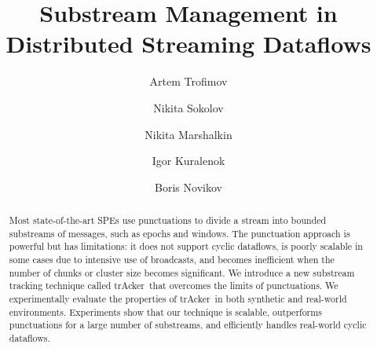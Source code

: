 \documentclass[sigconf]{acmart}
\newcommand {\tracker} {trAcker}
\begin{document}
\title {Substream Management in Distributed Streaming Dataflows}

\author{Artem Trofimov}

\author{Nikita Sokolov}

\author{Nikita Marshalkin}

\author{Igor Kuralenok}

\author{Boris Novikov}


\begin{abstract}
Most state-of-the-art SPEs use punctuations to divide a stream into bounded substreams of messages, such as epochs and windows. The punctuation approach is powerful but has limitations: it does not support cyclic dataflows, is poorly scalable in some cases due to intensive use of broadcasts, and becomes inefficient when the number of chunks or cluster size becomes significant. We introduce a new substream tracking technique called \tracker\ that overcomes the limits of punctuations. We experimentally evaluate the properties of \tracker\ in both synthetic and real-world environments. Experiments show that our technique is scalable, outperforms punctuations for a large number of substreams, and efficiently handles real-world cyclic dataflows.
\end{abstract}
\end{document}
